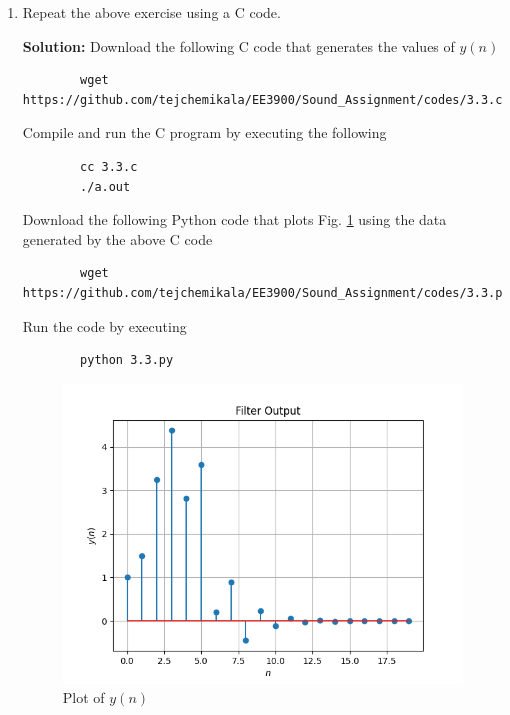 \documentclass[journal,12pt,twocolumn]{IEEEtran}
\newcommand{\solution}{\noindent \textbf{Solution: }}
\numberwithin{equation}{section}
\renewcommand\thesection{\arabic{section}}
\begin{document}
\begin{enumerate}[label=\thesection.\arabic*,ref=\thesection.\theenumi]
	\item Repeat the above exercise using a C code.
	
	\solution Download the following C code that generates the values of $y(n)$
	\begin{lstlisting}
		wget https://github.com/tejchemikala/EE3900/Sound_Assignment/codes/3.3.c
	\end{lstlisting}
	
	Compile and run the C program by executing the following
	\begin{lstlisting}
		cc 3.3.c
		./a.out
	\end{lstlisting}
	
	Download the following Python code that plots Fig. \ref{fig-3.3} using the data generated by the above C code
	\begin{lstlisting}
		wget https://github.com/tejchemikala/EE3900/Sound_Assignment/codes/3.3.py
	\end{lstlisting}
	
	Run the code by executing
	\begin{lstlisting}
		python 3.3.py
	\end{lstlisting}

	\begin{figure}[!ht]
		\centering
		\includegraphics[width=\columnwidth]{./figs/3.3.png}
		\caption{Plot of $y(n)$}
		\label{fig-3.3}	
	\end{figure}
	
	\end{enumerate}
	
\end{document}
